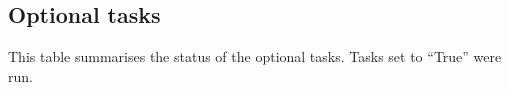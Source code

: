 \subsection{Optional tasks}

This table summarises the status of the optional tasks. Tasks set to ``True'' were run.

\hspace*{1cm}



\clearpage
